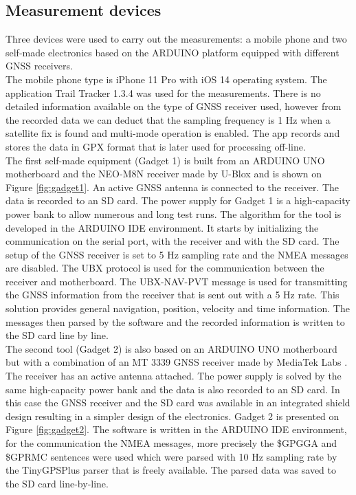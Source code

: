 \documentclass{article}
\begin{document}
		\subsection{Measurement devices}
			Three devices were used to carry out the measurements: a mobile phone and two self-made electronics based on the ARDUINO platform equipped with different GNSS receivers. \\
			The mobile phone type is iPhone 11 Pro with iOS 14 operating system. The application Trail Tracker 1.3.4 was used for the measurements. There is no detailed information available on the type of GNSS receiver used, however from the recorded data we can deduct that the sampling frequency is 1 Hz when a satellite fix is found and multi-mode operation is enabled. The app records and stores the data in GPX format \cite{GPXSchemaDocumentation} that is later used for processing off-line. \\
			The first self-made equipment (Gadget 1) is built from an ARDUINO UNO motherboard and the NEO-M8N receiver made by U-Blox \cite{NEOM8SeriesUblox} and is shown on Figure \ref{fig:gadget1}. An active GNSS antenna is connected to the receiver. The data is recorded to an SD card. The power supply for Gadget 1 is a high-capacity power bank to allow numerous and long test runs. The algorithm for the tool is developed in the ARDUINO IDE environment. It starts by initializing the communication on the serial port, with the receiver and with the SD card. The setup of the GNSS receiver is set to 5 Hz sampling rate and the NMEA messages are disabled. The UBX protocol \cite{UbloxUbloxM82021} is used for the communication between the receiver and motherboard. The UBX-NAV-PVT message is used for transmitting the GNSS information from the receiver that is sent out with a 5 Hz rate. This solution provides general navigation, position, velocity and time information. The messages then parsed by the software and the recorded information is written to the SD card line by line. \\
			The second tool (Gadget 2) is also based on an ARDUINO UNO motherboard but with a combination of an MT 3339 GNSS receiver made by MediaTek Labs \cite{MT3339MediaTekLabs}. The receiver has an active antenna attached. The power supply is solved by the same high-capacity power bank and the data is also recorded to an SD card. In this case the GNSS receiver and the SD card was available in an integrated shield design \cite{OverviewAdafruitUltimate} resulting in a simpler design of the electronics. Gadget 2 is presented on Figure \ref{fig:gadget2}. The software is written in the ARDUINO IDE environment, for the communication the NMEA messages, more precisely the \$GPGGA and \$GPRMC sentences were used which were parsed with 10 Hz sampling rate by the TinyGPSPlus parser \cite{TinyGPSArduiniana} that is freely available. The parsed data was saved to the SD card line-by-line. \\
\end{document}
